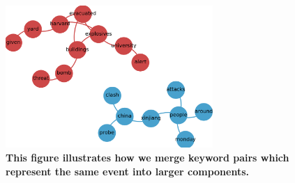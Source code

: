 \documentclass[10pt,letterpaper]{article}
\begin{document}
\begin{figure}
  \begin{center}
    \includegraphics[width=0.7\textwidth]{figures_SI/Pictures_and_Drawings/connected_components}
    \caption{\textbf{This figure illustrates how we merge keyword
        pairs which represent the same event into larger components.
      }}
    \label{fig:connected_components}
  \end{center}
\end{figure}
\end{document}
